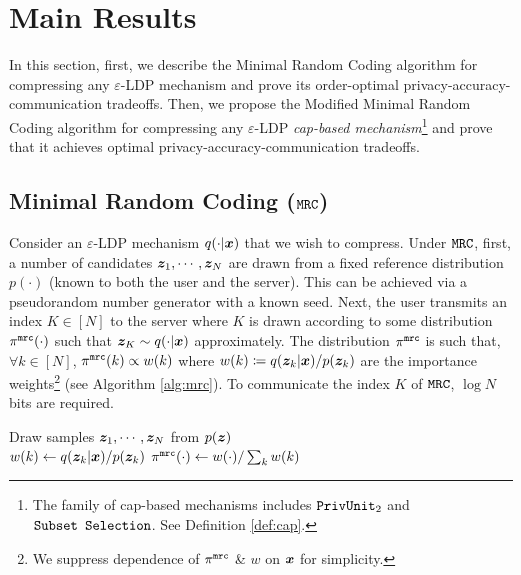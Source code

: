 \section{Main Results}
\label{sec:main_results}
In this section, first, we describe the Minimal Random Coding algorithm for compressing any $\varepsilon$-LDP  mechanism and prove its order-optimal privacy-accuracy-communication tradeoffs. Then, we propose the Modified Minimal Random Coding algorithm for compressing any $\varepsilon$-LDP \emph{cap-based mechanism}\footnote{The family of cap-based mechanisms includes
$\texttt{PrivUnit}_2$ and $\texttt{Subset Selection}$. See Definition \ref{def:cap}.} and prove that it achieves optimal privacy-accuracy-communication tradeoffs.

\subsection{Minimal Random Coding (\texorpdfstring{$\MRC$}{MRC})}
\label{subsec:mrc}
Consider an $\varepsilon$-LDP mechanism $q(\cdot|{\boldsymbol{x}})$ that we wish to compress. Under $\MRC$, first, a number of candidates ${\boldsymbol{z}}_1, \cdots, {\boldsymbol{z}}_N$ are drawn from a fixed reference distribution $p(\cdot)$ (known to both the user and the server). This can be achieved via a pseudorandom number generator with a known seed. Next, the user transmits an index $K \in [N]$ to the server where $K$ is drawn according to some distribution $\pi^{\texttt{mrc}}(\cdot)$ such that ${\boldsymbol{z}}_K \sim q(\cdot|{\boldsymbol{x}})$ approximately. The distribution $\pi^{\texttt{mrc}}$ is such that, $\forall k \in [N]$,  $\pi^{\texttt{mrc}}(k) \propto w(k)$ where $w(k) \coloneqq q({\boldsymbol{z}}_k|{\boldsymbol{x}}) / p({\boldsymbol{z}}_k)$ are the importance weights\footnote{We suppress dependence of $\pi^{\texttt{mrc}}$ \& $w$ on ${\boldsymbol{x}}$ for simplicity.} (see Algorithm \ref{alg:mrc}). To communicate the index $K$ of $\MRC$, $\log N$ bits are required.

\begin{algorithm}
{}
Draw samples ${\boldsymbol{z}}_1 , \cdots, {\boldsymbol{z}}_N$ from $p({\boldsymbol{z}})$ \\
{
$w(k) \leftarrow q({\boldsymbol{z}}_k|{\boldsymbol{x}}) / p({\boldsymbol{z}}_k) $
}
$\pi^{\texttt{mrc}}(\cdot) \leftarrow w(\cdot) / \sum_{k}w(k)$\\
\caption{$\MRC$}
\label{alg:mrc}
\end{algorithm}

